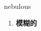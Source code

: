 
\begin{frame}
{\huge nebulous}
\begin{center}
\begin{enumerate}\Large
  \item \textbf{模糊的}
\end{enumerate}
\end{center}
\end{frame}

